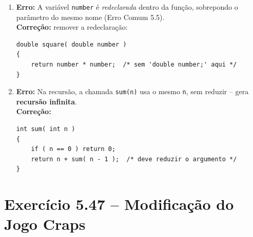 \documentclass[12pt,a4paper]{article}
\begin{document}
\begin{respostabox}
\begin{enumerate}[label=\textbf{\alph*)}]
\item \textbf{Erro:} A variável \texttt{number} é \textit{redeclarada} dentro da
função, sobrepondo o parâmetro do mesmo nome (Erro Comum 5.5).\\
\textbf{Correção:} remover a redeclaração:
\begin{lstlisting}
double square( double number )
{
    return number * number;  /* sem 'double number;' aqui */
}
\end{lstlisting}

\item \textbf{Erro:} Na recursão, a chamada \texttt{sum(n)} usa o mesmo \texttt{n},
sem reduzir -- gera \textbf{recursão infinita}.\\
\textbf{Correção:}
\begin{lstlisting}
int sum( int n )
{
    if ( n == 0 ) return 0;
    return n + sum( n - 1 );  /* deve reduzir o argumento */
}
\end{lstlisting}

\end{enumerate}
\end{respostabox}

\section{Exercício 5.47 -- Modificação do Jogo Craps}
\end{document}
